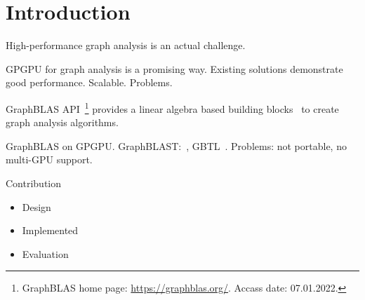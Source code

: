 \section{Introduction}

High-performance graph analysis is an actual challenge. \cite{Coimbra2021}

GPGPU for graph analysis is a promising way. 
Existing solutions demonstrate good performance.
Scalable. 
Problems.

GraphBLAS API~\cite{!!!}\footnote{GraphBLAS home page: \url{https://graphblas.org/}. Accass date: 07.01.2022.} provides a linear algebra based building blocks~\cite{7761646} to create graph analysis algorithms.

GraphBLAS on GPGPU.
GraphBLAST:~\cite{yang2019graphblast}, GBTL~\cite{!!!}.
Problems: not portable, no multi-GPU support.

Contribution
\begin{itemize}
    \item Design
    \item Implemented
    \item Evaluation
\end{itemize}
